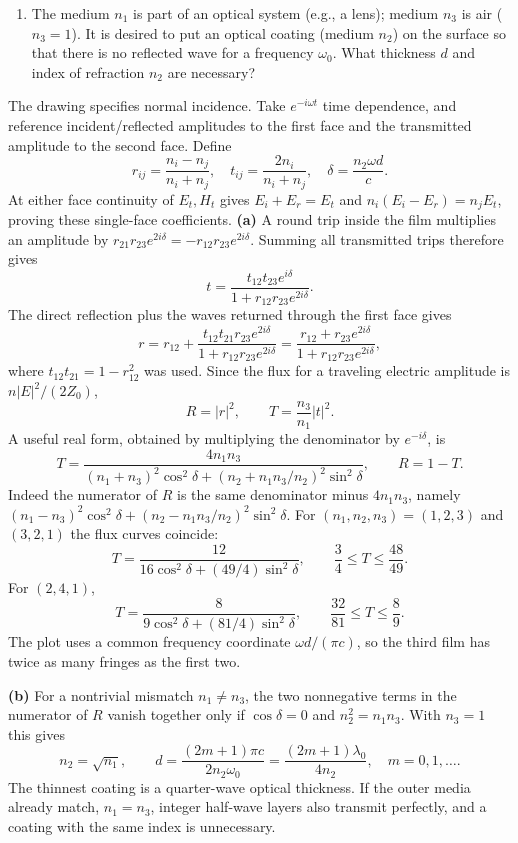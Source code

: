 \begin{enumerate}
\item[(b)] The medium $n_{1}$ is part of an optical system (e.g., a lens); medium $n_{3}$ is air ($n_{3}=1$). It is desired to put an optical coating (medium $n_{2}$) on the surface so that there is no reflected wave for a frequency $\omega_{0}$. What thickness $d$ and index of refraction $n_{2}$ are necessary?
\end{enumerate}
\solution
The drawing specifies normal incidence. Take $e^{-i\omega t}$ time
dependence, and reference incident/reflected amplitudes to the first
face and the transmitted amplitude to the second face. Define
\[
r_{ij}=\frac{n_i-n_j}{n_i+n_j},\quad
 t_{ij}=\frac{2n_i}{n_i+n_j},\quad \delta=\frac{n_2\omega d}{c}.
\]
At either face continuity of $E_t,H_t$ gives
$E_i+E_r=E_t$ and $n_i(E_i-E_r)=n_jE_t$, proving these single-face
coefficients.
\textbf{(a)} A round trip inside the film multiplies an amplitude by
$r_{21}r_{23}e^{2i\delta}=-r_{12}r_{23}e^{2i\delta}$.
Summing all transmitted trips therefore gives
\[
t=\frac{t_{12}t_{23}e^{i\delta}}{1+r_{12}r_{23}e^{2i\delta}}.
\]
The direct reflection plus the waves returned through the first
face gives
\[
r=r_{12}+\frac{t_{12}t_{21}r_{23}e^{2i\delta}}
 {1+r_{12}r_{23}e^{2i\delta}}
=\frac{r_{12}+r_{23}e^{2i\delta}}{1+r_{12}r_{23}e^{2i\delta}},
\]
where $t_{12}t_{21}=1-r_{12}^2$ was used. Since the flux for a
traveling electric amplitude is $n|E|^2/(2Z_0)$,
\[
\boxed{R=|r|^2,\qquad T=\frac{n_3}{n_1}|t|^2.}
\]
A useful real form, obtained by multiplying the denominator by
$e^{-i\delta}$, is
\[
\boxed{T=\frac{4n_1n_3}
 {(n_1+n_3)^2\cos^2\delta+(n_2+n_1n_3/n_2)^2\sin^2\delta},
\qquad R=1-T.}
\]
Indeed the numerator of $R$ is the same denominator minus $4n_1n_3$,
namely $(n_1-n_3)^2\cos^2\delta+(n_2-n_1n_3/n_2)^2\sin^2\delta$.
For $(n_1,n_2,n_3)=(1,2,3)$ and $(3,2,1)$ the flux curves coincide:
\[
T=\frac{12}{16\cos^2\delta+(49/4)\sin^2\delta},\qquad
\frac34\leq T\leq\frac{48}{49}.
\]
For $(2,4,1)$,
\[
T=\frac8{9\cos^2\delta+(81/4)\sin^2\delta},\qquad
\frac{32}{81}\leq T\leq\frac89.
\]
The plot uses a common frequency coordinate $\omega d/(\pi c)$,
so the third film has twice as many fringes as the first two.
\begin{center}

\end{center}
\textbf{(b)} For a nontrivial mismatch $n_1\ne n_3$, the two
nonnegative terms in the numerator of $R$ vanish together only if
$\cos\delta=0$ and $n_2^2=n_1n_3$. With $n_3=1$ this gives
\[
\boxed{n_2=\sqrt{n_1},\qquad
 d=\frac{(2m+1)\pi c}{2n_2\omega_0}
  =\frac{(2m+1)\lambda_0}{4n_2},\quad m=0,1,\ldots.}
\]
The thinnest coating is a quarter-wave optical thickness. If the
outer media already match, $n_1=n_3$, integer half-wave layers also
transmit perfectly, and a coating with the same index is unnecessary.

